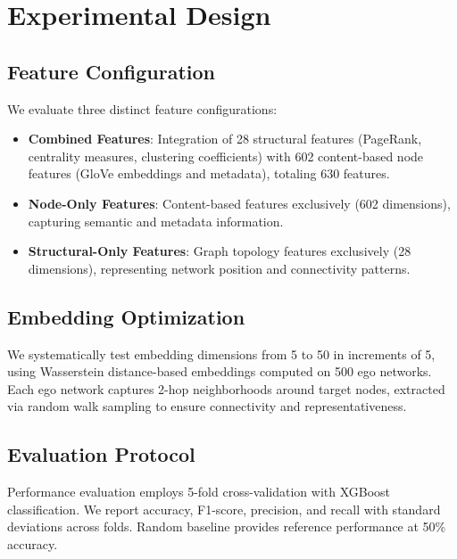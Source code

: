 \documentclass[linenumbers]{aastex701}
\begin{document}
\section{Experimental Design} \label{sec:methods}

\subsection{Feature Configuration}
We evaluate three distinct feature configurations:
\begin{itemize}
\item \textbf{Combined Features}: Integration of 28 structural features (PageRank, centrality measures, clustering coefficients) with 602 content-based node features (GloVe embeddings and metadata), totaling 630 features.
\item \textbf{Node-Only Features}: Content-based features exclusively (602 dimensions), capturing semantic and metadata information.
\item \textbf{Structural-Only Features}: Graph topology features exclusively (28 dimensions), representing network position and connectivity patterns.
\end{itemize}

\subsection{Embedding Optimization}
We systematically test embedding dimensions from 5 to 50 in increments of 5, using Wasserstein distance-based embeddings computed on 500 ego networks. Each ego network captures 2-hop neighborhoods around target nodes, extracted via random walk sampling to ensure connectivity and representativeness.

\subsection{Evaluation Protocol}
Performance evaluation employs 5-fold cross-validation with XGBoost classification. We report accuracy, F1-score, precision, and recall with standard deviations across folds. Random baseline provides reference performance at 50\% accuracy.

\end{document}
